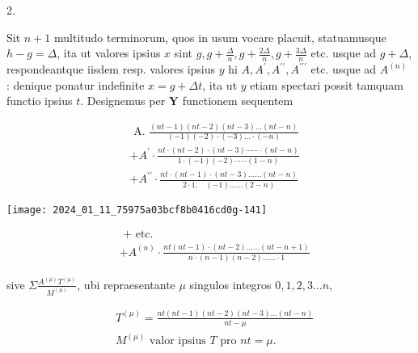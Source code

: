 \documentclass[10pt]{article}
\begin{document}
2.

Sit \(n+1\) multitudo terminorum, quos in usum vocare placuit, statuamusque \(h-g=\Delta\), ita ut valores ipsius \(x\) sint \(g, g+\frac{\Delta}{n}, g+\frac{2 \Delta}{n}, g+\frac{3 \Delta}{n}\) etc. usque ad \(g+\Delta\), respondeantque iisdem resp. valores ipsius \(y\) hi \(A, A^{\prime}, A^{\prime \prime}, A^{\prime \prime \prime}\) etc. usque ad \(A^{(n)}\) : denique ponatur indefinite \(x=g+\Delta t\), ita ut \(y\) etiam spectari possit tamquam functio ipsius \(t\). Designemus per \(\boldsymbol{Y}\) functionem sequentem

\[
\begin{aligned}
& \text { A. } \frac{(n t-1)(n t-2)(n t-3) \ldots(n t-n)}{(-1)(-2) \cdot(-3) \ldots \cdot(-n)} \\
& +A^{\prime} \cdot \frac{n t \cdot(n t-2) \cdot(n t-3) \cdots \cdots \cdot(n t-n)}{1 \cdot(-1)(-2) \cdots \cdots(1-n)} \\
& +A^{\prime \prime} \cdot \frac{n t \cdot(n t-1) \cdot(n t-3) \ldots \ldots(n t-n)}{2 \cdot 1 . \quad(-1) \ldots \ldots(2-n)}
\end{aligned}
\]

\begin{center}
\texttt{[image: 2024\_01\_11\_75975a03bcf8b0416cd0g-141]}
\end{center}

\[
\begin{aligned}
& \text { + etc. } \\
& +A^{(n)} \cdot \frac{n t(n t-1) \cdot(n t-2) \ldots \ldots(n t-n+1)}{n \cdot(n-1)(n-2) \ldots \ldots \cdot 1}
\end{aligned}
\]

sive \(\Sigma \frac{A^{(\mu)} T^{(\mu)}}{M^{(\mu)}}\), ubi repraesentante \(\mu\) singulos integros \(0,1,2,3 \ldots n\),

\[
\begin{aligned}
& T^{(\mu)}=\frac{n t(n t-1)(n t-2)(n t-3) \ldots(n t-n)}{n t-\mu} \\
& M^{(\mu)} \text { valor ipsius } T \text { pro } n t=\mu .
\end{aligned}
\]
\end{document}
